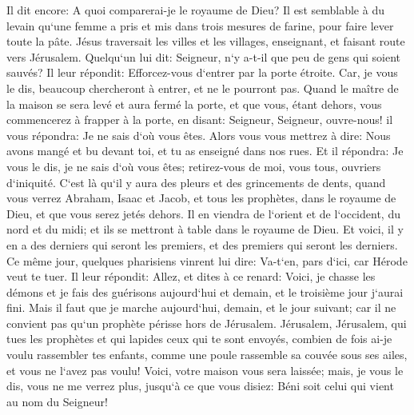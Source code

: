 \verse Il dit encore: A quoi comparerai-je le royaume de Dieu? 
\verse Il est semblable à du levain qu`une femme a pris et mis dans trois mesures de farine, pour faire lever toute la pâte. 
\verse Jésus traversait les villes et les villages, enseignant, et faisant route vers Jérusalem. 
\verse Quelqu`un lui dit: Seigneur, n`y a-t-il que peu de gens qui soient sauvés? Il leur répondit: 
\verse Efforcez-vous d`entrer par la porte étroite. Car, je vous le dis, beaucoup chercheront à entrer, et ne le pourront pas. 
\verse Quand le maître de la maison se sera levé et aura fermé la porte, et que vous, étant dehors, vous commencerez à frapper à la porte, en disant: Seigneur, Seigneur, ouvre-nous! il vous répondra: Je ne sais d`où vous êtes. 
\verse Alors vous vous mettrez à dire: Nous avons mangé et bu devant toi, et tu as enseigné dans nos rues. 
\verse Et il répondra: Je vous le dis, je ne sais d`où vous êtes; retirez-vous de moi, vous tous, ouvriers d`iniquité. 
\verse C`est là qu`il y aura des pleurs et des grincements de dents, quand vous verrez Abraham, Isaac et Jacob, et tous les prophètes, dans le royaume de Dieu, et que vous serez jetés dehors. 
\verse Il en viendra de l`orient et de l`occident, du nord et du midi; et ils se mettront à table dans le royaume de Dieu. 
\verse Et voici, il y en a des derniers qui seront les premiers, et des premiers qui seront les derniers. 
\verse Ce même jour, quelques pharisiens vinrent lui dire: Va-t`en, pars d`ici, car Hérode veut te tuer. 
\verse Il leur répondit: Allez, et dites à ce renard: Voici, je chasse les démons et je fais des guérisons aujourd`hui et demain, et le troisième jour j`aurai fini. 
\verse Mais il faut que je marche aujourd`hui, demain, et le jour suivant; car il ne convient pas qu`un prophète périsse hors de Jérusalem. 
\verse Jérusalem, Jérusalem, qui tues les prophètes et qui lapides ceux qui te sont envoyés, combien de fois ai-je voulu rassembler tes enfants, comme une poule rassemble sa couvée sous ses ailes, et vous ne l`avez pas voulu! 
\verse Voici, votre maison vous sera laissée; mais, je vous le dis, vous ne me verrez plus, jusqu`à ce que vous disiez: Béni soit celui qui vient au nom du Seigneur! 

\chapter{}

